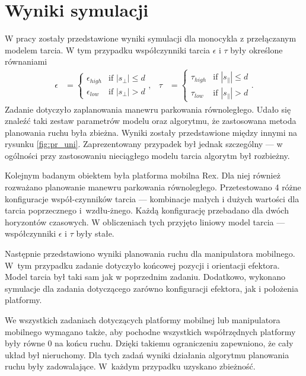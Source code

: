 \section{Wyniki symulacji}
\hspace{\parindent}W pracy zostały przedstawione wyniki symulacji dla monocykla z przełączanym modelem tarcia. W tym przypadku współczynniki tarcia $\epsilon$ i $\tau$ były określone równaniami
\begin{equation*}
\begin{aligned}
\epsilon&=\begin{cases}
\epsilon_{high} &\mbox{if } |s_\perp| \leq d \\
\epsilon_{low} &\mbox{if } |s_\perp| > d
\end{cases}, &
\tau&=\begin{cases}
\tau_{high} &\mbox{if } |s_\parallel| \leq d \\
\tau_{low} &\mbox{if } |s_\parallel| > d
\end{cases}.
\end{aligned}
\end{equation*}
Zadanie dotyczyło zaplanowania manewru parkowania równoległego.
Udało się znaleźć taki zestaw parametrów modelu oraz algorytmu, że zastosowana metoda planowania ruchu była zbieżna. Wyniki zostały przedstawione między innymi na rysunku \ref{fig:pr_uni}. Zaprezentowany przypadek był jednak szczególny --- w ogólności przy zastosowaniu nieciągłego modelu tarcia algorytm był rozbieżny.

Kolejnym badanym obiektem była platforma mobilna Rex. Dla niej również rozważano planowanie manewru parkowania równoległego. Przetestowano 4 różne konfiguracje współ-czynników tarcia --- kombinacje małych i dużych wartości dla tarcia poprzecznego i~wzdłu-żnego. Każdą konfigurację przebadano dla dwóch horyzontów czasowych. W obliczeniach tych przyjęto liniowy model tarcia --- współczynniki $\epsilon$ i $\tau$ były stałe. 

Następnie przedstawiono wyniki planowania ruchu dla manipulatora mobilnego. W~tym przypadku zadanie dotyczyło końcowej pozycji i orientacji efektora. Model tarcia był taki sam jak w poprzednim zadaniu. Dodatkowo, wykonano symulacje dla zadania dotyczącego zarówno konfiguracji efektora, jak i położenia platformy.

We wszystkich zadaniach dotyczących platformy mobilnej lub manipulatora mobilnego wymagano także, aby pochodne wszystkich współrzędnych platformy były równe 0 na końcu ruchu. Dzięki takiemu ograniczeniu zapewniono, że cały układ był nieruchomy. Dla tych zadań wyniki działania algorytmu planowania ruchu były zadowalające. W~każdym przypadku uzyskano zbieżność. 

